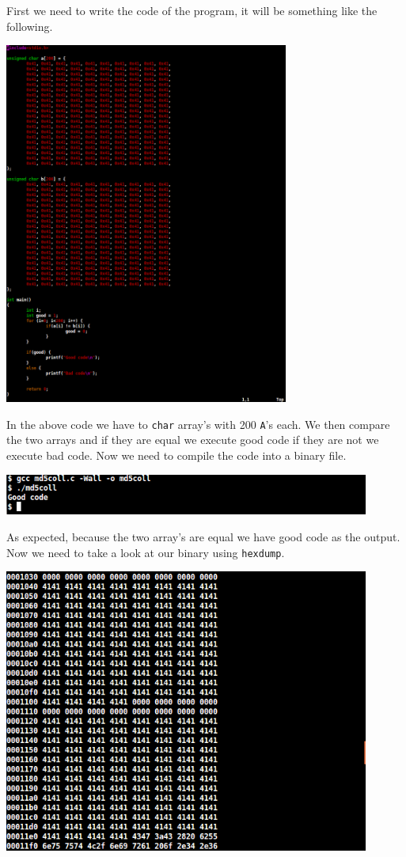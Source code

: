 \documentclass[a4paper]{article}
\begin{document}
\bigskip

First we need to write the code of the program, it will be something like the following.

\bigskip

\includegraphics[width=0.7\textwidth]{bash/md5collarray.png}

\bigskip

In the above code we have to \texttt{char} array's with 200 \texttt{A}'s each. We then compare the two arrays and if they are equal we execute good code if they are not we execute bad code. Now we need to compile the code into a binary file.

\bigskip

\includegraphics[width=0.9\textwidth]{bash/md5collarraygcc.png}

As expected, because the two array's are equal we have good code as the output. Now we need to take a look at our binary using \texttt{hexdump}.

\bigskip

\includegraphics[width=0.9\textwidth]{bash/md5collarraydump.png}
\end{document}
